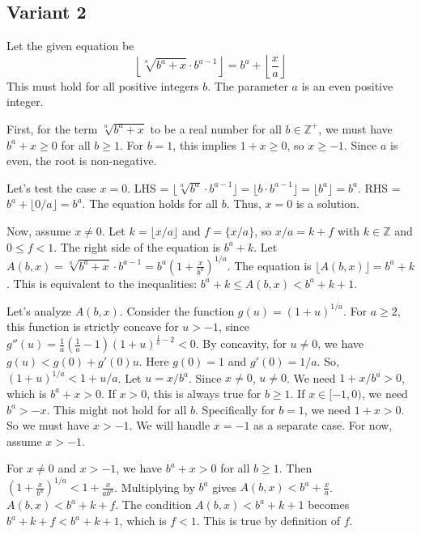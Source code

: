 \documentclass[12pt,a4paper]{article}
\theoremstyle{definition}
\begin{document}
    \subsection{Variant 2}
    Let the given equation be
    \[ \left\lfloor \sqrt[a]{b^a + x} \cdot b^{a-1} \right\rfloor = b^a + \left\lfloor \frac{x}{a} \right\rfloor \]
    This must hold for all positive integers $b$. The parameter $a$ is an even positive integer.

    First, for the term $\sqrt[a]{b^a+x}$ to be a real number for all $b \in \mathbb{Z}^+$, we must have $b^a+x \geq 0$ for all $b \geq 1$. For $b=1$, this implies $1+x \geq 0$, so $x \geq -1$. Since $a$ is even, the root is non-negative.

    Let's test the case $x=0$.
    LHS = $\lfloor \sqrt[a]{b^a} \cdot b^{a-1} \rfloor = \lfloor b \cdot b^{a-1} \rfloor = \lfloor b^a \rfloor = b^a$.
    RHS = $b^a + \lfloor 0/a \rfloor = b^a$.
    The equation holds for all $b$. Thus, $x=0$ is a solution.

    Now, assume $x \neq 0$. Let $k = \lfloor x/a \rfloor$ and $f = \{x/a\}$, so $x/a = k+f$ with $k \in \mathbb{Z}$ and $0 \leq f < 1$.
    The right side of the equation is $b^a+k$.
    Let $A(b,x) = \sqrt[a]{b^a + x} \cdot b^{a-1} = b^a \left(1 + \frac{x}{b^a}\right)^{1/a}$.
    The equation is $\lfloor A(b,x) \rfloor = b^a+k$. This is equivalent to the inequalities:
    $b^a+k \leq A(b,x) < b^a+k+1$.

    Let's analyze $A(b,x)$. Consider the function $g(u)=(1+u)^{1/a}$. For $a \geq 2$, this function is strictly concave for $u > -1$, since $g''(u) = \frac{1}{a}\left(\frac{1}{a}-1\right)(1+u)^{\frac{1}{a}-2} < 0$.
    By concavity, for $u \neq 0$, we have $g(u) < g(0) + g'(0)u$.
    Here $g(0)=1$ and $g'(0)=1/a$. So, $(1+u)^{1/a} < 1+u/a$.
    Let $u=x/b^a$. Since $x \neq 0$, $u \neq 0$. We need $1+x/b^a > 0$, which is $b^a+x > 0$.
    If $x>0$, this is always true for $b \geq 1$. If $x \in [-1, 0)$, we need $b^a > -x$. This might not hold for all $b$. Specifically for $b=1$, we need $1+x>0$. So we must have $x>-1$. We will handle $x=-1$ as a separate case. For now, assume $x>-1$.

    For $x \neq 0$ and $x>-1$, we have $b^a+x>0$ for all $b \geq 1$.
    Then $\left(1 + \frac{x}{b^a}\right)^{1/a} < 1 + \frac{x}{ab^a}$.
    Multiplying by $b^a$ gives $A(b,x) < b^a + \frac{x}{a}$.
    $A(b,x) < b^a + k+f$.
    The condition $A(b,x) < b^a+k+1$ becomes $b^a+k+f < b^a+k+1$, which is $f<1$. This is true by definition of $f$.
\end{document}
